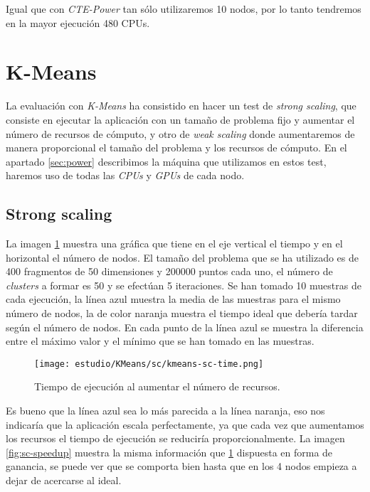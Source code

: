 Igual que con \textit{CTE-Power} tan sólo utilizaremos 10  nodos, por lo tanto tendremos en la mayor ejecución 480 CPUs.

\section{K-Means}

La evaluación con \textit{K-Means} ha consistido en hacer un test de \textit{strong scaling}, que consiste en ejecutar la aplicación con un tamaño de problema fijo y aumentar el número de recursos de cómputo, y otro de \textit{weak scaling} donde aumentaremos de manera proporcional el tamaño del problema y los recursos de cómputo. En el apartado \ref{sec:power} describimos la máquina que utilizamos en estos test, haremos uso de todas las \textit{CPUs} y \textit{GPUs} de cada nodo.

\subsection{Strong scaling}

La imagen \ref{fig:sc-time} muestra una gráfica que tiene en el eje vertical el tiempo y en el horizontal el número de nodos. El tamaño del problema que se ha utilizado es de 400 fragmentos de 50 dimensiones y 200000 puntos cada uno, el número de \textit{clusters} a formar es 50 y se efectúan 5 iteraciones. Se han tomado 10 muestras de cada ejecución, la línea azul muestra la media de las muestras para el mismo número de nodos, la de color naranja muestra el tiempo ideal que debería tardar según el número de nodos. En cada punto de la línea azul se muestra la diferencia entre el máximo valor y el mínimo que se han tomado en las muestras.

\begin{figure}[H]
	\centering 
	\caption{Tiempo de ejecución al aumentar el número de recursos.}
	\texttt{[image: estudio/KMeans/sc/kmeans-sc-time.png]}
	\label{fig:sc-time}
\end{figure}

Es bueno que la línea azul sea lo más parecida a la línea naranja, eso nos indicaría que la aplicación escala perfectamente, ya que cada vez que aumentamos los recursos el tiempo de ejecución se reduciría proporcionalmente. La imagen \ref{fig:sc-speedup} muestra la misma información que \ref{fig:sc-time} dispuesta en forma de ganancia, se puede ver que se comporta bien hasta que en los 4 nodos empieza a dejar de acercarse al ideal.

